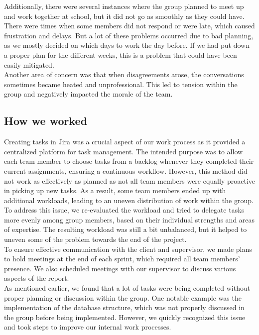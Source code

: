 \noindent 
Additionally, there were several instances where the group planned to meet up and work together at school, but it did not go as smoothly as they could have. There were times when some members did not respond or were late, which caused frustration and delays. But a lot of these problems occurred due to bad planning, as we mostly decided on which days to work the day before. If we had put down a proper plan for the different weeks, this is a problem that could have been easily mitigated. \\


\noindent 
Another area of concern was that when disagreements arose, the conversations sometimes became heated and unprofessional. This led to tension within the group and negatively impacted the morale of the team. \\

\subsection{How we worked}

Creating tasks in Jira was a crucial aspect of our work process as it provided a centralized platform for task management. The intended purpose was to allow each team member to choose tasks from a backlog whenever they completed their current assignments, ensuring a continuous workflow. However, this method did not work as effectively as planned as not all team members were equally proactive in picking up new tasks. As a result, some team members ended up with additional workloads, leading to an uneven distribution of work within the group.\\

\noindent 
To address this issue, we re-evaluated the workload and tried to delegate tasks more evenly among group members, based on their individual strengths and areas of expertise. The resulting workload was still a bit unbalanced, but it helped to uneven some of the problem towards the end of the project. \\

\noindent
To ensure effective communication with the client and supervisor, we made plans to hold meetings at the end of each sprint, which required all team members' presence. We also scheduled meetings with our supervisor to discuss various aspects of the report. \\

\noindent
As mentioned earlier, we found that a lot of tasks were being completed without proper planning or discussion within the group. One notable example was the implementation of the database structure, which was not properly discussed in the group before being implemented. However, we quickly recognized this issue and took steps to improve our internal work processes. \\


